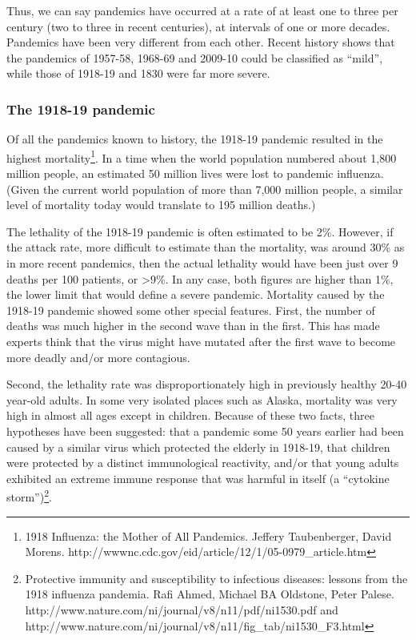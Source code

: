 \documentclass[12pt, a4]{scrartcl}
\begin{document}
Thus, we can say pandemics have occurred at a rate of at least one to three per century (two to three in recent centuries), at intervals of one or more decades. Pandemics have been very different from each other. Recent history shows that the pandemics of 1957-58, 1968-69 and 2009-10 could be classified as “mild”, while those of 1918-19 and 1830 were far
more severe.

\subsubsection {The 1918-19 pandemic}
Of all the pandemics known to history, the 1918-19 pandemic resulted in the highest mortality\footnote{1918 Influenza: the Mother of All Pandemics. Jeffery Taubenberger, David Morens.
http://wwwnc.cdc.gov/eid/article/12/1/05-0979_article.htm}. In a time when the world population numbered about 1,800 million people, an estimated 50 million lives were lost to pandemic influenza. (Given the current world population of more than 7,000 million people, a similar level of mortality today would translate to 195 million deaths.)

The lethality of the 1918-19 pandemic is often estimated to be 2\%. However, if the attack rate, more difficult to estimate than the mortality, was around 30\% as in more recent pandemics, then the actual lethality would have been just over 9 deaths per 100 patients, or >9\%. In any case, both figures are higher than 1\%, the lower limit that would define a severe pandemic. Mortality caused by the 1918-19 pandemic showed some other special features. First, the number of deaths was much higher in the second wave than in the first. This has made experts think that the virus might have mutated after the first wave to become more deadly and/or more contagious. 

Second, the lethality rate was disproportionately high in previously healthy 20-40 year-old adults. In some very isolated places such as Alaska, mortality was very high in almost all ages except in children. Because of these two facts, three hypotheses have been suggested: that a pandemic some 50 years earlier had been caused by a similar virus which protected the elderly in 1918-19, that children were protected by a distinct immunological reactivity, and/or that young adults exhibited an extreme immune response that was harmful in itself (a “cytokine storm”)\footnote{Protective immunity and susceptibility to infectious diseases: lessons from the 1918 influenza pandemia. Rafi Ahmed, Michael BA Oldstone, Peter Palese. http://www.nature.com/ni/journal/v8/n11/pdf/ni1530.pdf and http://www.nature.com/ni/journal/v8/n11/fig_tab/ni1530_F3.html}.
\end{document}
